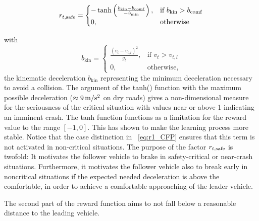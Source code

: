 \documentclass[review]{elsarticle}
\providecommand{\sub}[1]{_{\mathrm{#1}}}  %
\providecommand{\3}{{\ss}}
\begin{document}
	
	
	\begin{equation}
	\label{eq:r1_CFP}
	r_{t, \rm safe} = 
	\begin{cases}
	-\tanh\left(\frac{b\sub{kin}-b\sub{comf}}{-\dot{v}\sub{min}}\right),& \text{if } b\sub{kin}>b\sub{comf}\\
	0,              & \text{otherwise}
	\end{cases}
	\end{equation}
	
	with
	\begin{equation}
	\label{bkin}
	b\sub{kin} = 
	\begin{cases}
	\frac{(v_t-v_{t,l})^2}{g_t},& \text{if } v_t>v_{t,l}\\
	0,              & \text{otherwise},
	\end{cases}
	\end{equation}
	the kinematic deceleration $b\sub{kin}$ representing the minimum deceleration necessary to avoid a collision.
	The argument of the tanh() function with  the
	maximum possible deceleration ($\approx \unit[9]{m/s^2}$ on dry roads) gives a
	non-dimensional measure for the seriousness of the critical situation
	with values 
	near or above 1 indicating an imminent crash.  The tanh function functions as a limitation for the reward value to the range $[-1,0]$. This has shown to make the learning process more stable. Notice that the case distinction in ~\eqref{eq:r1_CFP}  ensures that
	this term is not activated in non-critical situations. The purpose of
	the factor $r_{t, \rm safe}$ is twofold: It motivates the follower vehicle to
	brake in safety-critical or near-crash situations.  Furthermore, it motivates the follower vehicle also to break early in noncritical situations if the expected needed deceleration is above the comfortable, in order to achieve a comfortable
	approaching of the leader vehicle.
	
	The second part of the reward function aims to not fall below a reasonable
	distance to the leading vehicle.
	
\end{document}
